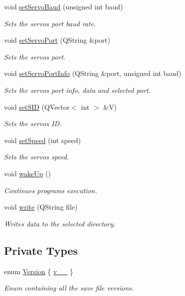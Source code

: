 \begin{DoxyCompactItemize}
void \hyperlink{a00008_a009d3d1b99007b14fadb49996fac49d6}{set\+Servo\+Baud} (unsigned int baud)
\begin{DoxyCompactList}\small\item\em Sets the servos port baud rate. \end{DoxyCompactList}\item 
void \hyperlink{a00008_a144e31105019d833f59ca2eba012e638}{set\+Servo\+Port} (Q\+String \&port)
\begin{DoxyCompactList}\small\item\em Sets the servos port. \end{DoxyCompactList}\item 
void \hyperlink{a00008_a76af3e89d1a8705426584bedb0624909}{set\+Servo\+Port\+Info} (Q\+String \&port, unsigned int baud)
\begin{DoxyCompactList}\small\item\em Sets the servos port info, data and selected port. \end{DoxyCompactList}\item 
void \hyperlink{a00008_ac3471e5020f5d9babd3f2ff7b3b82aca}{set\+S\+I\+D} (Q\+Vector$<$ int $>$ \&V)
\begin{DoxyCompactList}\small\item\em Sets the servos I\+D. \end{DoxyCompactList}\item 
void \hyperlink{a00008_ad187f5aec23e1a7e5bd5f4d316d80cbe}{set\+Speed} (int speed)
\begin{DoxyCompactList}\small\item\em Sets the servos speed. \end{DoxyCompactList}\item 
void \hyperlink{a00008_a5f32574f843d76deffec45995028389b}{wake\+Up} ()
\begin{DoxyCompactList}\small\item\em Continues program\textquotesingle{}s execution. \end{DoxyCompactList}\item 
void \hyperlink{a00008_aca68fe85a100a052c4d41f0fa88cc152}{write} (Q\+String file)
\begin{DoxyCompactList}\small\item\em Writes data to the selected directory. \end{DoxyCompactList}\end{DoxyCompactItemize}
\subsection*{Private Types}
\begin{DoxyCompactItemize}
\item 
enum \hyperlink{a00008_aeccce0ac6a969e2ee7cbe91687e2d085}{Version} \{ \hyperlink{a00008_aeccce0ac6a969e2ee7cbe91687e2d085a319b6bf2cb120faeefbd0a5118ece7e3}{v\+\_\+\_}
 \}
\begin{DoxyCompactList}\small\item\em Enum containing all the save file versions. \end{DoxyCompactList}\end{DoxyCompactItemize}
